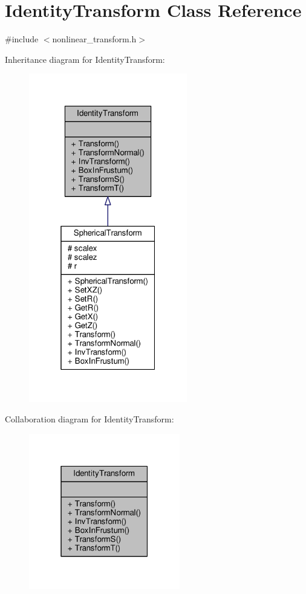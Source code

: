 \hypertarget{classIdentityTransform}{}\section{Identity\+Transform Class Reference}
\label{classIdentityTransform}


{\ttfamily \#include $<$nonlinear\+\_\+transform.\+h$>$}



Inheritance diagram for Identity\+Transform\+:
\nopagebreak
\begin{figure}[H]
\begin{center}
\leavevmode
\includegraphics[width=196pt]{d1/df3/classIdentityTransform__inherit__graph}
\end{center}
\end{figure}


Collaboration diagram for Identity\+Transform\+:
\nopagebreak
\begin{figure}[H]
\begin{center}
\leavevmode
\includegraphics[width=187pt]{d0/d2e/classIdentityTransform__coll__graph}
\end{center}
\end{figure}
